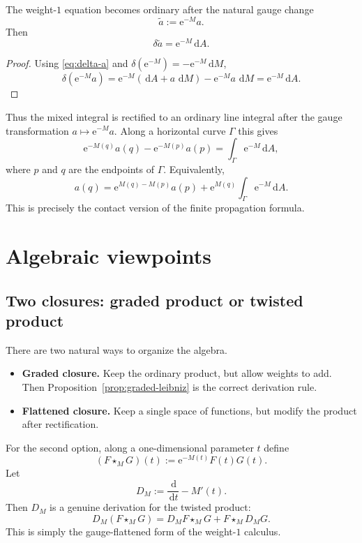 \documentclass[11pt]{article}
\newcommand{\dd}{\,\mathrm{d}}
\newcommand{\ee}{\mathrm{e}}
\newcommand{\del}{\delta}
\begin{document}
The weight-$1$ equation becomes ordinary after the natural gauge change
\begin{equation}
\label{eq:rectified-a}
\widetilde a:=\ee^{-M}a.
\end{equation}
Then
\begin{equation}
\label{eq:delta-rectified}
\del\widetilde a=\ee^{-M}\dd A.
\end{equation}

\begin{proof}
Using \eqref{eq:delta-a} and $\del(\ee^{-M})=-\ee^{-M}\dd M$,
\[
\del(\ee^{-M}a)
=\ee^{-M}(\dd A+a\,\dd M)-\ee^{-M}a\,\dd M
=\ee^{-M}\dd A.
\]
\end{proof}

Thus the mixed integral is rectified to an ordinary line integral after the gauge transformation $a\mapsto \ee^{-M}a$. Along a horizontal curve $\Gamma$ this gives
\begin{equation}
\label{eq:rectified-integral}
\ee^{-M(q)}a(q)-\ee^{-M(p)}a(p)
=
\int_\Gamma \ee^{-M}\dd A,
\end{equation}
where $p$ and $q$ are the endpoints of $\Gamma$.
Equivalently,
\begin{equation}
\label{eq:contact-finite-solution}
a(q)=\ee^{M(q)-M(p)}a(p)+\ee^{M(q)}\int_\Gamma \ee^{-M}\dd A.
\end{equation}
This is precisely the contact version of the finite propagation formula.

\section{Algebraic viewpoints}

\subsection{Two closures: graded product or twisted product}

There are two natural ways to organize the algebra.
\begin{itemize}[leftmargin=1.5em]
\item \textbf{Graded closure.} Keep the ordinary product, but allow weights to add. Then Proposition~\ref{prop:graded-leibniz} is the correct derivation rule.
\item \textbf{Flattened closure.} Keep a single space of functions, but modify the product after rectification.
\end{itemize}

For the second option, along a one-dimensional parameter $t$ define
\begin{equation}
\label{eq:star-product}
(F\star_M G)(t):=\ee^{-M(t)}F(t)G(t).
\end{equation}
Let
\begin{equation}
\label{eq:Dm}
D_M:=\frac{\dd}{\dd t}-M'(t).
\end{equation}
Then $D_M$ is a genuine derivation for the twisted product:
\begin{equation}
\label{eq:star-derivation}
D_M(F\star_M G)=D_MF\star_M G+F\star_M D_MG.
\end{equation}
This is simply the gauge-flattened form of the weight-$1$ calculus.
\end{document}
